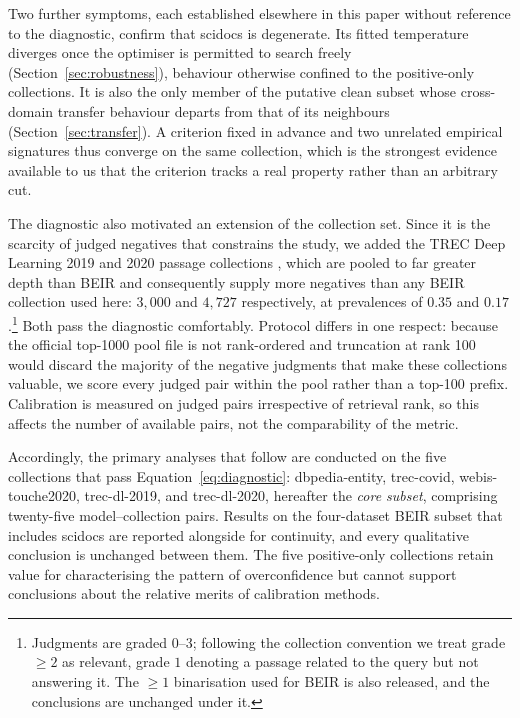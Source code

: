 \documentclass[sn-mathphys-num,pdflatex]{sn-jnl}
\begin{document}
Two further symptoms, each established elsewhere in this paper without reference to
the diagnostic, confirm that scidocs is degenerate. Its fitted temperature diverges
once the optimiser is permitted to search freely (Section~\ref{sec:robustness}),
behaviour otherwise confined to the positive-only collections. It is also the only
member of the putative clean subset whose cross-domain transfer behaviour departs
from that of its neighbours (Section~\ref{sec:transfer}). A criterion fixed in
advance and two unrelated empirical signatures thus converge on the same
collection, which is the strongest evidence available to us that the criterion
tracks a real property rather than an arbitrary cut.

The diagnostic also motivated an extension of the collection set. Since it is the
scarcity of judged negatives that constrains the study, we added the TREC Deep
Learning 2019 and 2020 passage collections \cite{craswell2020}, which are pooled to
far greater depth than BEIR and consequently supply more negatives than any BEIR
collection used here: $3{,}000$ and $4{,}727$ respectively, at prevalences of
$0.35$ and $0.17$.\footnote{Judgments are graded $0$--$3$; following the collection
convention we treat grade $\geq 2$ as relevant, grade $1$ denoting a passage
related to the query but not answering it. The $\geq 1$ binarisation used for BEIR
is also released, and the conclusions are unchanged under it.} Both pass the
diagnostic comfortably. Protocol differs in one respect: because the official
top-1000 pool file is not rank-ordered and truncation at rank 100 would discard the
majority of the negative judgments that make these collections valuable, we score
every judged pair within the pool rather than a top-100 prefix. Calibration is
measured on judged pairs irrespective of retrieval rank, so this affects the number
of available pairs, not the comparability of the metric.

Accordingly, the primary analyses that follow are conducted on the five collections
that pass Equation~\eqref{eq:diagnostic}: dbpedia-entity, trec-covid,
webis-touche2020, trec-dl-2019, and trec-dl-2020, hereafter the \emph{core subset},
comprising twenty-five model--collection pairs. Results on the four-dataset BEIR
subset that includes scidocs are reported alongside for continuity, and every
qualitative conclusion is unchanged between them. The five positive-only
collections retain value for characterising the pattern of overconfidence but
cannot support conclusions about the relative merits of calibration methods.
\end{document}

